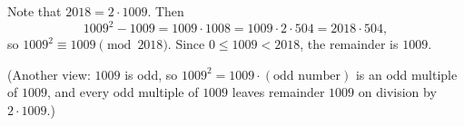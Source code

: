 Note that $2018=2\cdot1009$. Then
\[
1009^2-1009=1009\cdot1008=1009\cdot2\cdot504=2018\cdot504,
\]
so $1009^2\equiv1009\pmod{2018}$. Since $0\le1009<2018$, the remainder is $\boxed{1009}$.

(Another view: $1009$ is odd, so $1009^2=1009\cdot(\text{odd number})$ is an odd multiple of $1009$, and every odd multiple of $1009$ leaves remainder $1009$ on division by $2\cdot1009$.)
